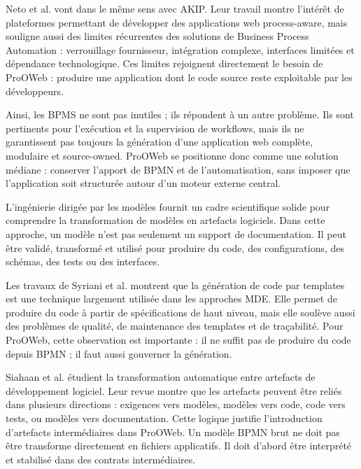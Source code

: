 Neto et al. \cite{neto2022} vont dans le même sens avec AKIP. Leur travail montre l’intérêt de plateformes permettant de développer des applications web process-aware, mais souligne aussi des limites récurrentes des solutions de Business Process Automation : verrouillage fournisseur, intégration complexe, interfaces limitées et dépendance technologique. Ces limites rejoignent directement le besoin de ProOWeb : produire une application dont le code source reste exploitable par les développeurs.

Ainsi, les BPMS ne sont pas inutiles ; ils répondent à un autre problème. Ils sont pertinents pour l’exécution et la supervision de workflows, mais ils ne garantissent pas toujours la génération d'une application web complète, modulaire et source-owned. ProOWeb se positionne donc comme une solution médiane : conserver l'apport de BPMN et de l'automatisation, sans imposer que l'application soit structurée autour d'un moteur externe central.


L’ingénierie dirigée par les modèles fournit un cadre scientifique solide pour comprendre la transformation de modèles en artefacts logiciels. Dans cette approche, un modèle n'est pas seulement un support de documentation. Il peut être validé, transformé et utilisé pour produire du code, des configurations, des schémas, des tests ou des interfaces.

Les travaux de Syriani et al. \cite{syriani2018} montrent que la génération de code par templates est une technique largement utilisée dans les approches MDE. Elle permet de produire du code à partir de spécifications de haut niveau, mais elle soulève aussi des problèmes de qualité, de maintenance des templates et de traçabilité. Pour ProOWeb, cette observation est importante : il ne suffit pas de produire du code depuis BPMN ; il faut aussi gouverner la génération.

Siahaan et al. \cite{siahaan2024} étudient la transformation automatique entre artefacts de développement logiciel. Leur revue montre que les artefacts peuvent être reliés dans plusieurs directions : exigences vers modèles, modèles vers code, code vers tests, ou modèles vers documentation. Cette logique justifie l'introduction d'artefacts intermédiaires dans ProOWeb. Un modèle BPMN brut ne doit pas être transforme directement en fichiers applicatifs. Il doit d'abord être interprété et stabilisé dans des contrats intermédiaires.


